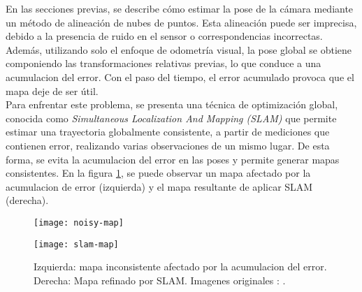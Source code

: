 En las secciones previas, se describe cómo estimar la pose de la cámara mediante un método de alineación de nubes de puntos. Esta alineación puede ser imprecisa, debido a la presencia de ruido en el sensor o correspondencias incorrectas. Además, utilizando solo el enfoque de odometría visual, la pose global se obtiene componiendo las transformaciones relativas previas, lo que conduce a una acumulacion del error. Con el paso del tiempo, el error acumulado provoca que el mapa deje de ser útil. \\
Para enfrentar este problema, se presenta una técnica de optimización global, conocida como \textit{\textsl{Simultaneous Localization And Mapping (SLAM)}} que permite estimar una trayectoria globalmente consistente, a partir de mediciones que contienen error, realizando varias observaciones de un mismo lugar. De esta forma, se evita la acumulacion del error en las poses y permite generar mapas consistentes. En la figura \ref{fig:maps-noisy-slam}, se puede observar un mapa afectado por la acumulacion de error (izquierda) y el mapa resultante de aplicar SLAM (derecha). \\

\begin{figure}[ht]
\centering
\begin{minipage}[h]{.45\textwidth}
\begin{center}
\texttt{[image: noisy-map]}
\end{center}
\end{minipage}
\hfill
\begin{minipage}[h]{.45\textwidth}
\begin{center}
\texttt{[image: slam-map]}
\end{center}
\end{minipage}
\hfill
\caption[Efecto de la acumulacion del error y optimización con SLAM sobre un mapa]
{Izquierda: mapa inconsistente afectado por la acumulacion del error. Derecha: Mapa refinado por SLAM. Imagenes originales : \cite{GrisettiKSB10}.}
\label{fig:maps-noisy-slam}
\end{figure}

